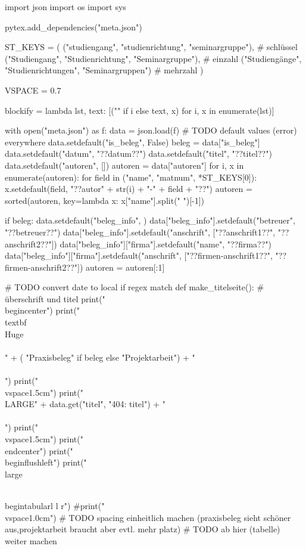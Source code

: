 
\begin{titlepage}
\begin{pycode}
import json
import os
import sys

pytex.add_dependencies("meta.json")

ST_KEYS = (
        ("studiengang", "studienrichtung", "seminargruppe"),  # schlüssel
        ("Studiengang", "Studienrichtung", "Seminargruppe"),  # einzahl
        ("Studiengänge", "Studienrichtungen", "Seminargruppen")  # mehrzahl
    )

VSPACE = 0.7

blockify = lambda lst, text: [("" if i else text, x) for i, x in enumerate(lst)]


with open("meta.json") as f:
    data = json.load(f)
# TODO default values (error) everywhere
data.setdefault("is_beleg", False)
beleg = data["is_beleg"]
data.setdefault("datum", "??datum??")
data.setdefault("titel", "??titel??")
data.setdefault("autoren", [{}])
autoren = data["autoren"]
for i, x in enumerate(autoren):
    for field in ("name", "matnum", *ST_KEYS[0]):
        x.setdefault(field, "??autor" + str(i) + "-" + field + "??")
autoren = sorted(autoren, key=lambda x: x["name"].split(" ")[-1])

if beleg:
    data.setdefault("beleg_info", {})
    data["beleg_info"].setdefault("betreuer", "??betreuer??")
    data["beleg_info"].setdefault("anschrift", ["??anschrift1??", "??anschrift2??"])
    data["beleg_info"]["firma"].setdefault("name", "??firma??")
    data["beleg_info"]["firma"].setdefault("anschrift", ["??firmen-anschrift1??", "??firmen-anschrift2??"])
    autoren = autoren[:1]

    # TODO convert date to local if regex match
def make_titelseite():    
    # überschrift und titel
    print("\\begin{center}")
    print("\\textbf{\\Huge\\\\ " + (
        "Praxisbeleg" if beleg else "Projektarbeit") + "\\\\}")
    print("\\vspace{1.5cm}")
    print("\\LARGE{" + data.get("titel", "404: titel") + " \\\\}")
    print("\\vspace{1.5cm}")
    print("\\end{center}")
    print("\\begin{flushleft}")
    print("\\large{\\begin{tabular}{l l r}")
    #print("\\vspace{1.0cm}")
    # TODO spacing einheitlich machen (praxisbeleg sieht schöner aus,projektarbeit     	braucht aber evtl. mehr platz)
    # TODO ab hier (tabelle) weiter machen

}
\end{pycode}
\end{titlepage}
